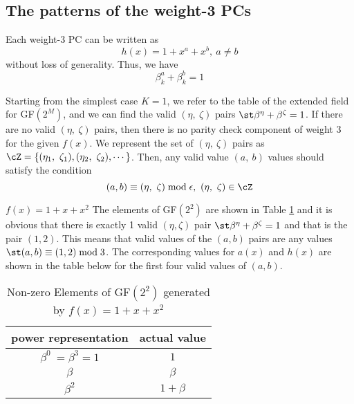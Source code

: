 \subsection{The patterns of the weight-3 PCs}
Each weight-3 PC can be written as 
\begin{equation}
h(x)=1+x^a+x^b,~a\neq b
\label{novelEqwt3}
\end{equation}
without loss of generality. Thus, we have 
\begin{equation}
\beta_k^a+\beta_k^b= 1
\label{novelEq5b}
\end{equation}

Starting from the simplest case $K=1$, we refer to the table of the extended field for GF$(2^M)$, and we can find the valid $(\eta,~\zeta)$ pairs $\st \beta^{\eta}+\beta^{\zeta}=1$. If there are no valid $(\eta,~\zeta)$ pairs, then there is no parity check component of weight $3$ for the given $f(x)$.
 We represent the set of $(\eta,~\zeta)$ pairs as 
$\cZ=\{ (\eta_1,~\zeta_1) ,( \eta_2,~\zeta_2),\cdots\}$. Then, any valid value $(a,~b)$ values should satisfy the condition
\begin{equation}
(a,b) \equiv (\eta,~\zeta) \bmod \epsilon,~(\eta,~\zeta)\in \cZ
\end{equation}
\begin{example}
$f(x)=1+x+x^2$ \newline
The elements of GF$(2^2)$ are shown in Table \ref{novelTab7} and it is obvious that there is exactly 1 valid $(\eta,\zeta)$ pair $\st \beta^{\eta}+\beta^{\zeta} = 1$ and that is the pair $(1,2)$.
This means that valid values of the $(a,b)$ pairs are any values $\st (a,b) \equiv (1,2) \bmod 3$.  The corresponding values for $a(x)$ and $h(x)$ are shown in the table below for the first four valid values of $(a,b)$.
\label{ex-5}
\end{example}

 \begin{table}[htbp]
 \caption{Non-zero Elements of GF$(2^2)$ generated by $f(x)=1+x+x^2$}
\centering
 \begin{tabular}{c c} 
 \hline
 power representation & actual value \\ [0.5ex] 
 \hline\hline
$\beta^0~=\beta^3=1$ & $1$\\
\hline
$\beta$ & $\beta$\\
\hline
$\beta^2$ &  $1+\beta$\\
\hline
 \end{tabular}
 \label{novelTab7}
\end{table}

